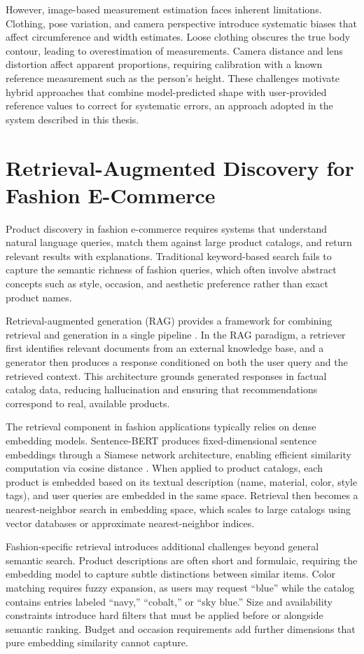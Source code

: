 However, image-based measurement estimation faces inherent limitations. Clothing, pose variation, and camera perspective introduce systematic biases that affect circumference and width estimates. Loose clothing obscures the true body contour, leading to overestimation of measurements. Camera distance and lens distortion affect apparent proportions, requiring calibration with a known reference measurement such as the person's height. These challenges motivate hybrid approaches that combine model-predicted shape with user-provided reference values to correct for systematic errors, an approach adopted in the system described in this thesis.

\section{Retrieval-Augmented Discovery for Fashion E-Commerce}
Product discovery in fashion e-commerce requires systems that understand natural language queries, match them against large product catalogs, and return relevant results with explanations. Traditional keyword-based search fails to capture the semantic richness of fashion queries, which often involve abstract concepts such as style, occasion, and aesthetic preference rather than exact product names.

Retrieval-augmented generation (RAG) provides a framework for combining retrieval and generation in a single pipeline \cite{lewis2020rag}. In the RAG paradigm, a retriever first identifies relevant documents from an external knowledge base, and a generator then produces a response conditioned on both the user query and the retrieved context. This architecture grounds generated responses in factual catalog data, reducing hallucination and ensuring that recommendations correspond to real, available products.

The retrieval component in fashion applications typically relies on dense embedding models. Sentence-BERT produces fixed-dimensional sentence embeddings through a Siamese network architecture, enabling efficient similarity computation via cosine distance \cite{reimers2019sbert}. When applied to product catalogs, each product is embedded based on its textual description (name, material, color, style tags), and user queries are embedded in the same space. Retrieval then becomes a nearest-neighbor search in embedding space, which scales to large catalogs using vector databases or approximate nearest-neighbor indices.

Fashion-specific retrieval introduces additional challenges beyond general semantic search. Product descriptions are often short and formulaic, requiring the embedding model to capture subtle distinctions between similar items. Color matching requires fuzzy expansion, as users may request ``blue'' while the catalog contains entries labeled ``navy,'' ``cobalt,'' or ``sky blue.'' Size and availability constraints introduce hard filters that must be applied before or alongside semantic ranking. Budget and occasion requirements add further dimensions that pure embedding similarity cannot capture.

